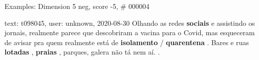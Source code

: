 \begin{frame}{Examples: Dimension 5 neg, score -5, \# 000004}
\footnotesize
\begin{alertblock}{text: t098045, user: unknown, 2020-08-30}
Olhando as redes \textbf{sociais} e assistindo os jornais, realmente parece que 
descobriram a vacina para o Covid, mas esqueceram de avisar pra quem realmente 
está de \textbf{isolamento} / \textbf{quarentena} . Bares e ruas 
\textbf{lotadas} , \textbf{praias} , parques, galera não tá nem aí. . 
\end{alertblock}
\end{frame}

